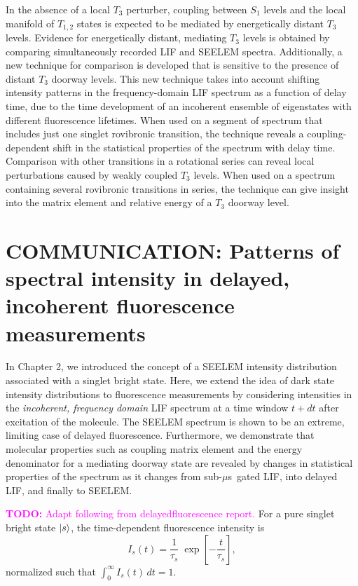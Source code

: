 \documentclass[12pt,draft]{mitthesis}
\newcommand{\TODO} [1]{\textcolor{magenta}{\textbf{TODO:} #1}}
\newcommand{\microsec}{$\mu$s}
\begin{document}
In the absence of a local $T_3$ perturber, coupling between $S_1$
levels and the local manifold of $T_{1,2}$ states is expected to be
mediated by energetically distant $T_3$ levels.  Evidence for
energetically distant, mediating $T_3$ levels is obtained by comparing
simultaneously recorded LIF and SEELEM spectra.  Additionally, a new
technique for comparison is developed that is sensitive to the
presence of distant $T_3$ doorway levels.  This new technique takes
into account shifting intensity patterns in the frequency-domain LIF
spectrum as a function of delay time, due to the time development of
an incoherent ensemble of eigenstates with different fluorescence
lifetimes.  When used on a segment of spectrum that includes just one
singlet rovibronic transition, the technique reveals a
coupling-dependent shift in the statistical properties of the spectrum
with delay time.  Comparison with other transitions in a rotational
series can reveal local perturbations caused by weakly coupled $T_3$
levels.  When used on a spectrum containing several rovibronic
transitions in series, the technique can give insight into the matrix
element and relative energy of a $T_3$ doorway level.

\section{COMMUNICATION: Patterns of spectral intensity in delayed,
  incoherent fluorescence measurements}

In Chapter 2, we introduced the concept of a SEELEM intensity
distribution associated with a singlet bright state.  Here, we extend
the idea of dark state intensity distributions to fluorescence
measurements by considering intensities in the \emph{incoherent,
  frequency domain} LIF spectrum at a time window $t+dt$ after
excitation of the molecule.  The SEELEM spectrum is shown to be an
extreme, limiting case of delayed fluorescence.  Furthermore, we
demonstrate that molecular properties such as coupling matrix element
and the energy denominator for a mediating doorway state are revealed
by changes in statistical properties of the spectrum as it changes
from sub-\microsec\ gated LIF, into delayed LIF, and finally to
SEELEM.

\TODO{Adapt following from delayedfluorescence report.}  For a pure
singlet bright state $\mathinner{|{s}\rangle}$, the time-dependent fluorescence
intensity is
\begin{equation}
  I_s(t) = \frac{1}{\tau_s} \;
           \exp \left[
             -\frac{t}{ \tau_s} 
           \right],
\end{equation}
normalized such that $\int_0^{\infty} I_s(t) \, dt = 1$.
\end{document}
